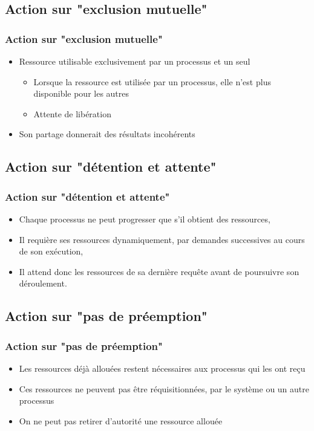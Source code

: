 \subsection{Action sur "exclusion mutuelle"}

\begin{frame}
\frametitle{Action sur "exclusion mutuelle"}
\begin{itemize}
\item Ressource utilisable exclusivement par un processus et un seul
\begin{itemize}
\item Lorsque la ressource est utilisée par un processus, elle n’est plus disponible pour les autres
\item Attente de libération
\end{itemize}
\item Son partage donnerait des résultats incohérents
\end{itemize}
\end{frame}


\subsection{Action sur "détention et attente"}
\begin{frame}
\frametitle{Action sur "détention et attente"}
\begin{itemize}
\item Chaque processus ne peut progresser que s’il obtient des ressources,
\item Il requière ses ressources dynamiquement, par demandes successives au cours de son exécution,
\item Il attend donc les ressources de sa dernière requête avant de poursuivre son déroulement.
\end{itemize}
\end{frame}

\subsection{Action sur "pas de préemption"}

\begin{frame}
\frametitle{Action sur "pas de préemption"}
\begin{itemize}
\item Les ressources déjà allouées restent nécessaires aux processus qui les ont reçu
\item Ces ressources ne peuvent pas être réquisitionnées, par le système ou un autre processus
\item On ne peut pas retirer d'autorité une ressource allouée
\end{itemize}
\end{frame}

